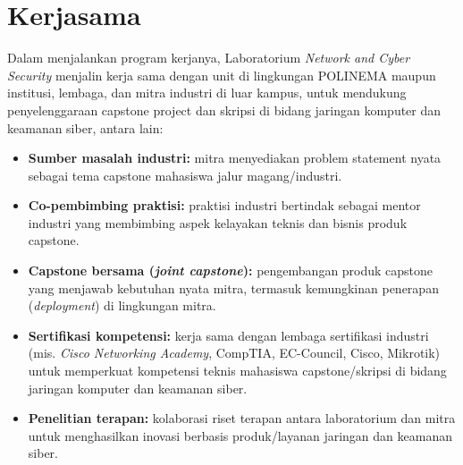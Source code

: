 \documentclass[12pt,a4paper]{report}
\begin{document}
\chapter{Kerjasama}

Dalam menjalankan program kerjanya, Laboratorium \emph{Network and Cyber Security} menjalin kerja sama dengan unit di lingkungan POLINEMA maupun institusi, lembaga, dan mitra industri di luar kampus, untuk mendukung penyelenggaraan capstone project dan skripsi di bidang jaringan komputer dan keamanan siber, antara lain:
\begin{itemize}
\item \textbf{Sumber masalah industri:} mitra menyediakan problem statement nyata sebagai tema capstone mahasiswa jalur magang/industri.
\item \textbf{Co-pembimbing praktisi:} praktisi industri bertindak sebagai mentor industri yang membimbing aspek kelayakan teknis dan bisnis produk capstone.
\item \textbf{Capstone bersama (\emph{joint capstone}):} pengembangan produk capstone yang menjawab kebutuhan nyata mitra, termasuk kemungkinan penerapan (\emph{deployment}) di lingkungan mitra.
\item \textbf{Sertifikasi kompetensi:} kerja sama dengan lembaga sertifikasi industri (mis. \emph{Cisco Networking Academy}, CompTIA, EC-Council, Cisco, Mikrotik) untuk memperkuat kompetensi teknis mahasiswa capstone/skripsi di bidang jaringan komputer dan keamanan siber.
\item \textbf{Penelitian terapan:} kolaborasi riset terapan antara laboratorium dan mitra untuk menghasilkan inovasi berbasis produk/layanan jaringan dan keamanan siber.
\end{itemize}

\PedomanPengesahan
\end{document}
